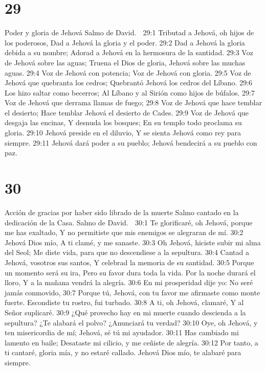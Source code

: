 \chapter{29}

Poder y gloria de Jehová 
Salmo de David. 

29:1 Tributad a Jehová, oh hijos de los poderosos, 
Dad a Jehová la gloria y el poder. 
29:2 Dad a Jehová la gloria debida a su nombre; 
Adorad a Jehová en la hermosura de la santidad. 
29:3 Voz de Jehová sobre las aguas; 
Truena el Dios de gloria, 
Jehová sobre las muchas aguas. 
29:4 Voz de Jehová con potencia; 
Voz de Jehová con gloria. 
29:5 Voz de Jehová que quebranta los cedros; 
Quebrantó Jehová los cedros del Líbano. 
29:6 Los hizo saltar como becerros; 
Al Líbano y al Sirión como hijos de búfalos. 
29:7 Voz de Jehová que derrama llamas de fuego; 
29:8 Voz de Jehová que hace temblar el desierto; 
Hace temblar Jehová el desierto de Cades. 
29:9 Voz de Jehová que desgaja las encinas, 
Y desnuda los bosques; 
En su templo todo proclama su gloria. 
29:10 Jehová preside en el diluvio, 
Y se sienta Jehová como rey para siempre. 
29:11 Jehová dará poder a su pueblo; 
Jehová bendecirá a su pueblo con paz. 

\chapter{30}

Acción de gracias por haber sido librado de la muerte 
Salmo cantado en la dedicación de la Casa. 
Salmo de David. 

30:1 Te glorificaré, oh Jehová, porque me has exaltado, 
Y no permitiste que mis enemigos se alegraran de mí. 
30:2 Jehová Dios mío, 
A ti clamé, y me sanaste. 
30:3 Oh Jehová, hiciste subir mi alma del Seol; 
Me diste vida, para que no descendiese a la sepultura. 
30:4 Cantad a Jehová, vosotros sus santos, 
Y celebrad la memoria de su santidad. 
30:5 Porque un momento será su ira, 
Pero su favor dura toda la vida. 
Por la noche durará el lloro, 
Y a la mañana vendrá la alegría. 
30:6 En mi prosperidad dije yo: 
No seré jamás conmovido, 
30:7 Porque tú, Jehová, con tu favor me afirmaste como monte fuerte. 
Escondiste tu rostro, fui turbado. 
30:8 A ti, oh Jehová, clamaré, 
Y al Señor suplicaré. 
30:9 ¿Qué provecho hay en mi muerte cuando descienda a la sepultura? 
¿Te alabará el polvo? ¿Anunciará tu verdad? 
30:10 Oye, oh Jehová, y ten misericordia de mí; 
Jehová, sé tú mi ayudador. 
30:11 Has cambiado mi lamento en baile; 
Desataste mi cilicio, y me ceñiste de alegría. 
30:12 Por tanto, a ti cantaré, gloria mía, y no estaré callado. 
Jehová Dios mío, te alabaré para siempre. 

